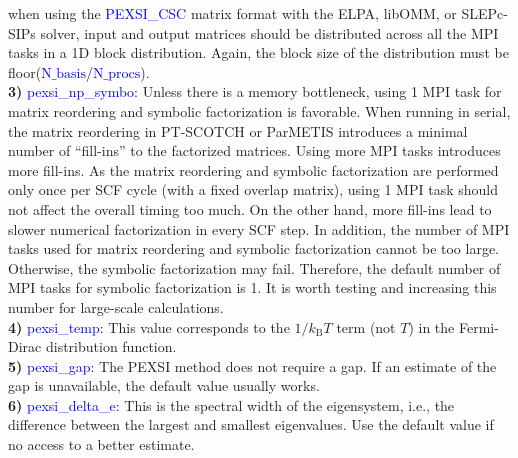 \documentclass{report}
\begin{document}
when using the \textcolor{blue}{PEXSI\_CSC} matrix format with the ELPA, libOMM, or SLEPc-SIPs solver, input and output matrices should be distributed across all the MPI tasks in a 1D block distribution.  Again, the block size of the distribution must be floor(\textcolor{blue}{$\text{N}\_\text{basis}$}/\textcolor{blue}{$\text{N}\_\text{procs}$}).\\

\textbf{3)} \textcolor{blue}{pexsi\_np\_symbo}:  Unless there is a memory bottleneck, using 1 MPI task for matrix reordering and symbolic factorization is favorable.  When running in serial, the matrix reordering in PT-SCOTCH or ParMETIS introduces a minimal number of ``fill-ins'' to the factorized matrices.  Using more MPI tasks introduces more fill-ins.  As the matrix reordering and symbolic factorization are performed only once per SCF cycle (with a fixed overlap matrix), using 1 MPI task should not affect the overall timing too much.  On the other hand, more fill-ins lead to slower numerical factorization in every SCF step.  In addition, the number of MPI tasks used for matrix reordering and symbolic factorization cannot be too large.  Otherwise, the symbolic factorization may fail.  Therefore, the default number of MPI tasks for symbolic factorization is 1.  It is worth testing and increasing this number for large-scale calculations.\\

\textbf{4)} \textcolor{blue}{pexsi\_temp}:  This value corresponds to the $1/k_\text{B} T$ term (not $T$) in the Fermi-Dirac distribution function.\\

\textbf{5)} \textcolor{blue}{pexsi\_gap}:  The PEXSI method does not require a gap.  If an estimate of the gap is unavailable, the default value usually works.\\

\textbf{6)} \textcolor{blue}{pexsi\_delta\_e}:  This is the spectral width of the eigensystem, i.e., the difference between the largest and smallest eigenvalues.  Use the default value if no access to a better estimate.\\
\end{document}
